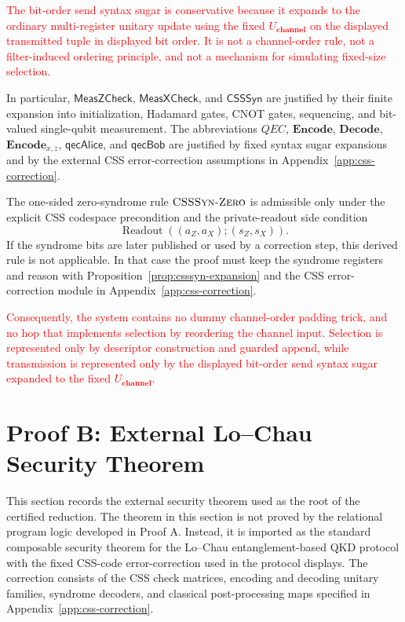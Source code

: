 \documentclass[acmsmall,screen,review,anonymous,nonacm]{acmart}
\theoremstyle{defn_style}
\begin{document}
\begin{theorem}[Soundness]
\textcolor{red}{The bit-order send syntax sugar is conservative because it expands to the
ordinary multi-register unitary update using the fixed
\(U_{\textbf{channel}}\) on the displayed transmitted tuple in displayed bit
order. It is not a channel-order rule, not a filter-induced ordering
principle, and not a mechanism for simulating fixed-size selection.}

In particular, \(\mathsf{MeasZCheck}\), \(\mathsf{MeasXCheck}\), and
\(\mathsf{CSSSyn}\) are justified by their finite expansion into
initialization, Hadamard gates, CNOT gates, sequencing, and bit-valued
single-qubit measurement. The abbreviations \(QEC\), \(\mathbf{Encode}\),
\(\mathbf{Decode}\), \(\mathbf{Encode}_{x,z}\),
\(\mathsf{qecAlice}\), and \(\mathsf{qecBob}\) are justified by fixed syntax
sugar expansions and by the external CSS error-correction assumptions in
Appendix~\ref{app:css-correction}.

The one-sided zero-syndrome rule \(\textsc{CSSSyn-Zero}\) is admissible only
under the explicit CSS codespace precondition and the private-readout side
condition
\[
\operatorname{Readout}((a_Z,a_X);(s_Z,s_X)).
\]
If the syndrome bits are later published or used by a correction step, this
derived rule is not applicable. In that case the proof must keep the syndrome
registers and reason with Proposition~\ref{prop:csssyn-expansion} and the
CSS error-correction module in Appendix~\ref{app:css-correction}.

\textcolor{red}{Consequently, the system contains no dummy channel-order
padding trick, and no hop that implements selection by reordering the
channel input. Selection is represented only by descriptor construction
and guarded append, while transmission is represented only by the displayed
bit-order send syntax sugar expanded to the fixed \(U_{\textbf{channel}}\).}
\end{theorem}
\newpage


\section{Proof B: External Lo--Chau Security Theorem}
\label{sec:external-lo-chau-security}

This section records the external security theorem used as the root of the
certified reduction.  The theorem in this section is not proved by the
relational program logic developed in Proof A.  Instead, it is imported as the
standard composable security theorem for the Lo--Chau entanglement-based QKD
protocol with the fixed CSS-code error-correction used in the protocol displays. The correction consists
of the CSS check matrices, encoding and decoding unitary families, syndrome
decoders, and classical post-processing maps specified in
Appendix~\ref{app:css-correction}.
\end{document}
